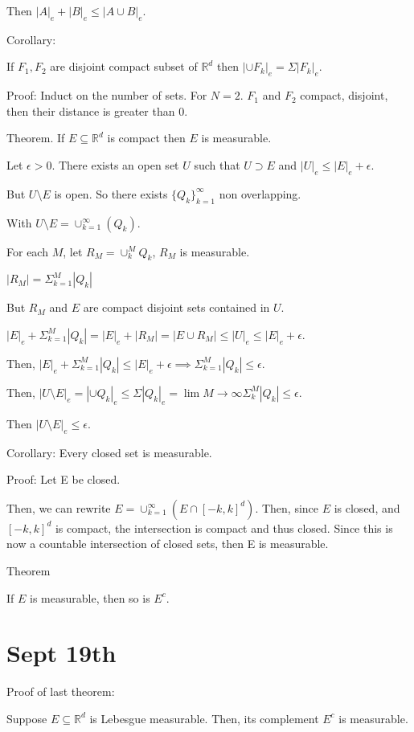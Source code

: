 \documentclass[10pt]{article}
\begin{document}
Then $|A|_e + |B|_e \leq |A \cup B|_e$.

Corollary:

If $F_1, F_2$ are disjoint compact subset of $\mathbb{R}^d$ then $|\cup F_k|_e = \Sigma |F_k|_e$.

Proof: Induct on the number of sets. For $N=2$. $F_1$ and $F_2$ compact, disjoint, then their distance is greater than 0.

Theorem. If $E \subseteq \mathbb{R}^d$ is compact then $E$ is measurable. 

Let $\epsilon > 0$. There exists an open set $U$ such that $U \supset E $ and $|U|_e \leq |E|_e + \epsilon$.

But $U \setminus E$ is open. So there exists $\{ Q_k \}_{k=1}^\infty$ non overlapping.

With $U \setminus E = \cup_{k=1}^\infty (Q_k)$.

For each $M$, let $R_M = \cup_k^M Q_k$, $R_M$ is measurable.

$| R_M| = \Sigma_{k=1}^M |Q_k|$

But $R_M$ and $E$ are compact disjoint sets contained in $U$. 

$|E|_e + \Sigma_{k=1}^M |Q_k|  = |E|_e + |R_M| = |E \cup R_M| \leq |U|_e \leq |E|_e + \epsilon$.

Then, $|E|_e + \Sigma_{k=1}^M |Q_k| \leq |E|_e + \epsilon \implies \Sigma_{k=1}^M |Q_k| \leq \epsilon$.

Then, $|U \setminus E|_e = |\cup Q_k|_e \leq \Sigma |Q_k|_e = \lim{M \rightarrow \infty} \Sigma_k^M |Q_k| \leq \epsilon$.

Then $|U \setminus E|_e \leq \epsilon$.

Corollary: Every closed set is measurable.

Proof: Let E be closed. 

Then, we can rewrite $E = \cup_{k=1}^\infty( E \cap [-k,k]^d)$. Then, since $E$ is closed, and $[-k,k]^d$ is compact, the intersection is compact and thus closed. Since this is now a countable intersection of closed sets, then E is measurable.

Theorem

If $E$ is measurable, then so is $E^c$.

\section*{Sept 19th}


Proof of last theorem:

Suppose $E \subseteq \mathbb{R}^d$ is Lebesgue measurable. Then, its complement $E^c$ is measurable.
\end{document}
